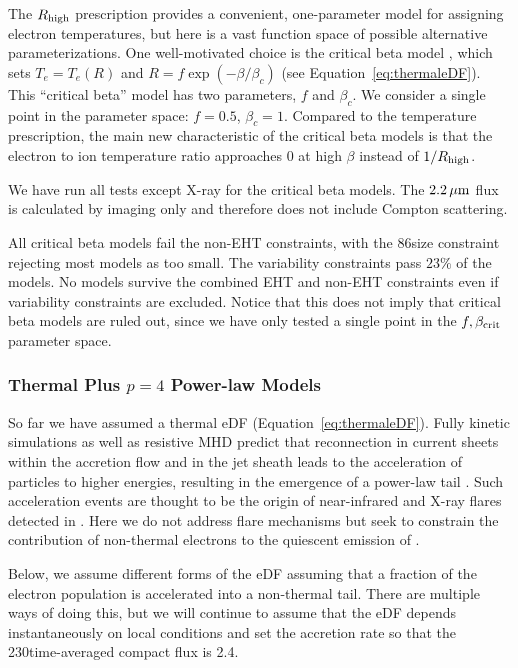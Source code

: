 The $R_\mathrm{high}$ prescription provides a convenient, one-parameter model for assigning electron temperatures, but here is a vast function space of possible alternative parameterizations.
One well-motivated choice is the critical beta model \citep{2020MNRAS.493.1404A}, which sets $T_e = T_e(R)$ and $R = f \exp(-\beta/\beta_c)$ (see Equation~\ref{eq:thermaleDF}).
This ``critical beta'' model has two parameters, $f$ and $\beta_c$.
We consider a single point in the parameter space: $f = 0.5$, $\beta_c = 1$.
Compared to the \Rh temperature prescription, the main new characteristic of the critical beta models is that the electron to ion temperature ratio approaches 0 at high $\beta$ instead of $1/R_\mathrm{high}$.

We have run all tests except X-ray for the critical beta models.
The $2.2\,\mu\mathrm{m}$ flux is calculated by imaging only and therefore does not include Compton scattering.

All critical beta models fail the non-EHT constraints, with the 86\GHz size constraint rejecting most models as too small.
The variability constraints pass $23\%$ of the models.
No models survive the combined EHT and non-EHT constraints even if variability constraints are excluded.
Notice that this does not imply that critical beta models are ruled out, since we have only tested a single point in the $f,\beta_{\rm crit}$ parameter space.

\subsubsection{Thermal Plus \texorpdfstring{$p = 4$}{p=4} Power-law Models}

So far we have assumed a thermal eDF (Equation~\ref{eq:thermaleDF}).
Fully kinetic simulations as well as resistive MHD predict that reconnection in current sheets within the accretion flow and in the jet sheath leads to the acceleration of particles to higher energies, resulting in the emergence of a power-law tail  \citep[e.g.,][and references therein]{Sironi2021}.
Such acceleration events are thought to be the origin of near-infrared and X-ray flares detected in \sgra.
Here we do not address flare mechanisms but seek to constrain the contribution of non-thermal electrons to the quiescent emission of \sgra.

Below, we assume different forms of the eDF assuming that a fraction of the electron population is accelerated into a non-thermal tail.
There are multiple ways of doing this, but we will continue to assume that the eDF depends instantaneously on local conditions and set the accretion rate so that the 230\GHz time-averaged compact flux is 2.4\Jy.

